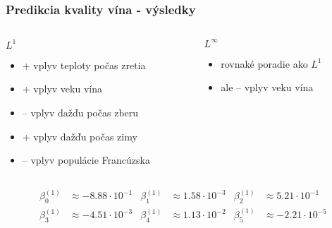 \documentclass[presentation.tex]{subfiles}
\begin{document}
	
	\begin{frame}
		\frametitle{Predikcia kvality vína - výsledky}
		\begin{columns}[t]
			\begin{column}{0.5\textwidth}
				\textbf{$L^1$}
				\begin{itemize}
					\item + vplyv teploty počas zretia
					\item + vplyv veku vína
					\item -- vplyv dažďu počas zberu
					\item + vplyv dažďu počas zimy
					\item -- vplyv populácie Francúzska 
				\end{itemize}
			\end{column}
			
			\begin{column}{0.5\textwidth}
				\textbf{$L^{\infty}$}
				\begin{itemize}
					\item rovnaké poradie ako \textbf{$L^1$}
					\item ale -- vplyv veku vína
				\end{itemize}
			\end{column}
		\end{columns}
		\begin{align*}
			\beta_0^{(1)} &\approx -8.88 \cdot 10^{-1}&\beta_1^{(1)} &\approx 1.58\cdot 10^{-3}&\beta_2^{(1)} &\approx 5.21\cdot 10^{-1} \\
			\beta_3^{(1)} &\approx -4.51\cdot 10^{-3} &\beta_4^{(1)} &\approx 1.13\cdot 10^{-2}&\beta_5^{(1)} &\approx -2.21\cdot 10^{-5}
		\end{align*}
	\end{frame}
	
\end{document}
